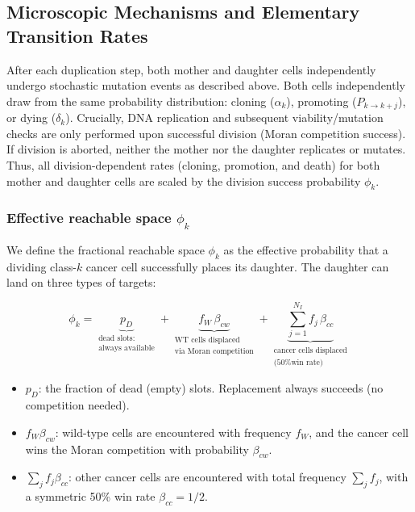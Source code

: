 \documentclass[11pt,a4paper]{article}
\begin{document}
\subsection{Microscopic Mechanisms and Elementary Transition Rates}

After each duplication step, both mother and daughter cells independently undergo stochastic mutation events as described above. Both cells independently draw from the same probability distribution: cloning ($\alpha_k$), promoting ($P_{k \to k+j}$), or dying ($\delta_k$). Crucially, DNA replication and subsequent viability/mutation checks are only performed upon successful division (Moran competition success). If division is aborted, neither the mother nor the daughter replicates or mutates. Thus, all division-dependent rates (cloning, promotion, and death) for both mother and daughter cells are scaled by the division success probability $\phi_k$.

\subsubsection*{Effective reachable space $\phi_k$}

We define the fractional reachable space $\phi_k$ as the effective probability that a dividing class-$k$ cancer cell successfully places its daughter. The daughter can land on three types of targets:

\begin{equation}
    \phi_k = \underbrace{p_D}_{\substack{\text{dead slots:}\\\text{always available}}}
           + \underbrace{f_W\,\beta_{cw}}_{\substack{\text{WT cells displaced}\\\text{via Moran competition}}}
           + \underbrace{\sum_{j=1}^{N_I} f_j\,\beta_{cc}}_{\substack{\text{cancer cells displaced}\\\text{(50\% win rate)}}}
\end{equation}

\begin{itemize}
    \item $p_D$: the fraction of dead (empty) slots. Replacement always succeeds (no competition needed).
    \item $f_W \beta_{cw}$: wild-type cells are encountered with frequency $f_W$, and the cancer cell wins the Moran competition with probability $\beta_{cw}$.
    \item $\sum_j f_j \beta_{cc}$: other cancer cells are encountered with total frequency $\sum_j f_j$, with a symmetric 50\% win rate $\beta_{cc} = 1/2$.
\end{itemize}
\end{document}
